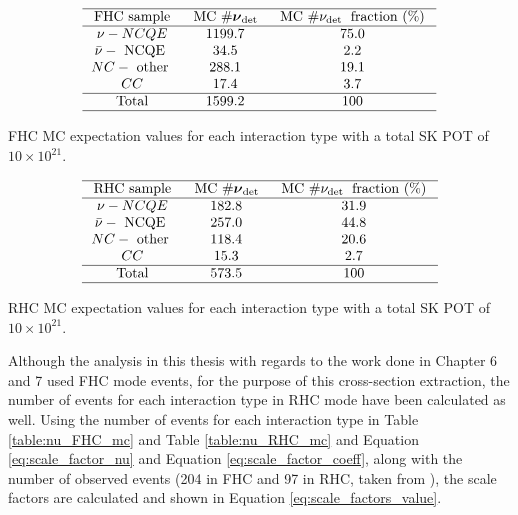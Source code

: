 \begin{table}
    $$
    \begin{array}{ccc}
    \hline \text { FHC sample } & \text { MC } \# \boldsymbol{\nu}_{\text {det }} & \text { MC } \# \nu_{\text {det }} \text { fraction (\%) } \\
    \hline \nu-N C Q E & 1199.7 & 75.0 \\
    \bar{\nu}-\text { NCQE } & 34.5 & 2.2 \\
    N C-\text { other } & 288.1 & 19.1 \\
    C C & 17.4 & 3.7\\
    \hline \text { Total } & 1599.2 & 100 \\
    \hline
    \end{array}
    $$
    \caption{FHC MC expectation values for each interaction type with a total SK POT of $10 \times 10^{21}$. }
    \label{table:nu_FHC_mc}
\end{table}


\begin{table}
    $$
    \begin{array}{ccc}
    \hline \text { RHC sample } & \text { MC } \# \boldsymbol{\nu}_{\text {det }} & \text { MC } \# \nu_{\text {det }} \text { fraction (\%) } \\
    \hline \nu-N C Q E & 182.8 & 31.9 \\
    \bar{\nu}-\text { NCQE } & 257.0 & 44.8 \\
    N C-\text { other } & 118.4 & 20.6 \\
    C C & 15.3 & 2.7 \\
    \hline \text { Total } & 573.5 & 100 \\
    \hline
    \end{array}
    $$
    \caption{RHC MC expectation values for each interaction type with a total SK POT of $10 \times 10^{21}$.}
    \label{table:nu_RHC_mc}
\end{table}

Although the analysis in this thesis with regards to the work done in Chapter 6 and 7 used FHC mode events, for the purpose of this cross-section extraction, the number of events for each interaction type in RHC mode have been calculated as well. Using the number of events for each interaction type in Table \ref{table:nu_FHC_mc} and Table \ref{table:nu_RHC_mc} and Equation \ref{eq:scale_factor_nu} and Equation \ref{eq:scale_factor_coeff}, along with the number of observed events (204 in FHC and 97 in RHC, taken from \cite{Abe_2019}), the scale factors are calculated and shown in Equation \ref{eq:scale_factors_value}.

